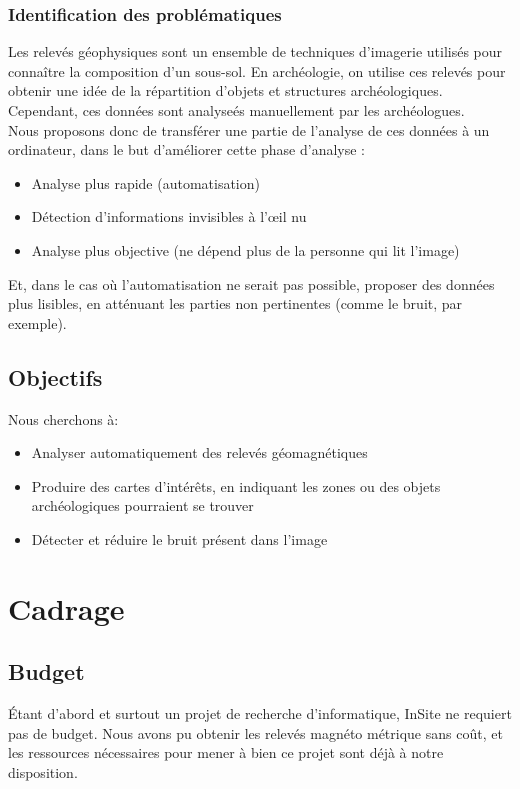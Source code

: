\documentclass[a4paper, 12pt, titlepage, oneside, french]{article}
\begin{document}
		\subsubsection{Identification des problématiques}
		Les relevés géophysiques sont un ensemble de techniques d'imagerie utilisés pour connaître la composition d'un sous-sol.
		En archéologie, on utilise ces relevés pour obtenir une idée de la répartition d'objets et structures archéologiques.
		Cependant, ces données sont analyseés manuellement par les archéologues. \\
		Nous proposons donc de transférer une partie de l'analyse de ces données à un ordinateur, dans le but d'améliorer cette phase d'analyse :
		\begin{itemize}
			\item Analyse plus rapide (automatisation)
			\item Détection d'informations invisibles à l'œil nu
			\item Analyse plus objective (ne dépend plus de la personne qui lit l'image)
		\end{itemize}
		Et, dans le cas où l'automatisation ne serait pas possible, proposer des données plus lisibles, en atténuant les parties non pertinentes (comme le bruit, par exemple).


	\subsection{Objectifs}%
	Nous cherchons à:
	\begin{itemize}
		\item Analyser automatiquement des relevés géomagnétiques 
		\item Produire des cartes d'intérêts, en indiquant les zones ou des objets archéologiques pourraient se trouver
		\item Détecter et réduire le bruit présent dans l'image
	\end{itemize}

	\newpage

\section{Cadrage}
	\subsection{Budget}
	Étant d'abord et surtout un projet de recherche d'informatique, InSite ne requiert pas de budget. Nous avons pu obtenir les relevés magnéto métrique sans coût, et les ressources nécessaires pour mener à bien ce projet sont déjà à notre disposition. 
\end{document}
